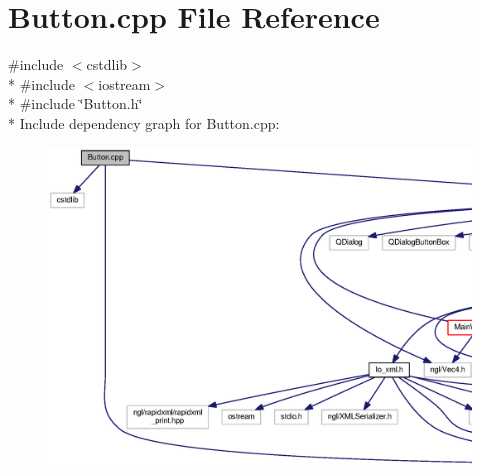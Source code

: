 \section{Button.\-cpp File Reference}
\label{_button_8cpp}
{\ttfamily \#include $<$cstdlib$>$}\\*
{\ttfamily \#include $<$iostream$>$}\\*
{\ttfamily \#include \char`\"{}Button.\-h\char`\"{}}\\*
Include dependency graph for Button.\-cpp\-:\nopagebreak
\begin{figure}[H]
\begin{center}
\leavevmode
\includegraphics[width=350pt]{_button_8cpp__incl}
\end{center}
\end{figure}
